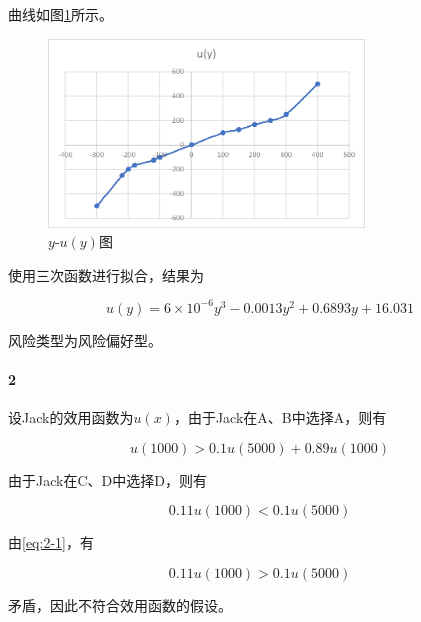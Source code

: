 \documentclass[UTF8]{ctexart}
\begin{document}
    曲线如图\ref{fig:curve}所示。

    \begin{figure}
        \centering
        \includegraphics[height=5cm]{HW02-1.png}
        \caption{$y$-$u(y)$图}
        \label{fig:curve}
    \end{figure}

    使用三次函数进行拟合，结果为

    \begin{equation}
        u(y) = 6\times 10^{-6}y^3 - 0.0013y^2 + 0.6893y + 16.031
    \end{equation}

    风险类型为风险偏好型。

    \paragraph*{2} 设Jack的效用函数为$u(x)$，由于Jack在A、B中选择A，则有

    \begin{equation}
        u(1000) > 0.1u(5000) + 0.89u(1000)
        \label{eq:2-1}
    \end{equation}

    由于Jack在C、D中选择D，则有

    \begin{equation}
        0.11 u(1000) < 0.1u(5000)
        \label{eq:2-2}
    \end{equation}

    由\eqref{eq:2-1}，有

    \begin{equation}
        0.11 u(1000) > 0.1u(5000)
    \end{equation}

    矛盾，因此不符合效用函数的假设。
\end{document}
